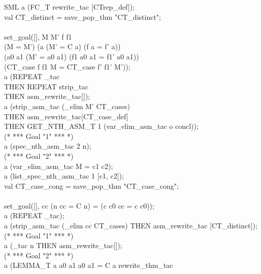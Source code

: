{\begin{GFT}{SML}
\+a (FC\_T rewrite\_tac [CTrep\_def]);\\
\+val CT\_distinct = save\_pop\_thm "CT\_distinct";\\
\+\\
\+set\_goal([], \PrKM{}\MMM{\forall}M M' f f1\MMM{\bullet}\\
\+         (M = M') \MMM{\land} (\MMM{\forall}a\MMM{\bullet} (M' = C a) \MMM{\Rightarrow} (f a = f' a)) \MMM{\land}\\
\+         (\MMM{\forall}a0 a1\MMM{\bullet} (M' = a0  a1) \MMM{\Rightarrow} (f1 a0 a1 = f1' a0 a1)) \MMM{\Rightarrow}\\
\+         (CT\_case f f1 M = CT\_case f' f1' M')\PrKO{});\\
\+a (REPEAT \MMM{\forall}\_tac\\
\+	THEN REPEAT strip\_tac\\
\+	THEN asm\_rewrite\_tac[]);\\
\+a (strip\_asm\_tac (\MMM{\forall}\_elim \PrKM{}M'\PrKO{} CT\_cases)\\
\+	THEN asm\_rewrite\_tac[CT\_case\_def]\\
\+	THEN GET\_NTH\_ASM\_T 1 (var\_elim\_asm\_tac o concl));\\
\+(* *** Goal "1" *** *)\\
\+a (spec\_nth\_asm\_tac 2 \PrKM{}n\PrKO{});\\
\+(* *** Goal "2" *** *)\\
\+a (var\_elim\_asm\_tac \PrKM{}M = c1  c2\PrKO{});\\
\+a (list\_spec\_nth\_asm\_tac 1 [\PrKM{}c1\PrKO{}, \PrKM{}c2\PrKO{}]);\\
\+val CT\_case\_cong = save\_pop\_thm "CT\_case\_cong";\\
\+\\
\+set\_goal([], \PrKM{}\MMM{\forall}cc\MMM{\bullet} \MMM{\lnot} (\MMM{\exists}n\MMM{\bullet} cc = C n) = (\MMM{\exists}c c0\MMM{\bullet} cc = c  c0)\PrKO{});\\
\+a (REPEAT \MMM{\forall}\_tac);\\
\+a (strip\_asm\_tac (\MMM{\forall}\_elim \PrKM{}cc\PrKO{} CT\_cases) THEN asm\_rewrite\_tac [CT\_distinct]);\\
\+(* *** Goal "1" *** *)\\
\+a (\MMM{\exists}\_tac \PrKM{}n\PrKO{} THEN asm\_rewrite\_tac[]);\\
\+(* *** Goal "2" *** *)\\
\+a (LEMMA\_T \PrKM{}\MMM{\forall} a a0 a1\MMM{\bullet} \MMM{\lnot} a0  a1 = C a\PrKO{} rewrite\_thm\_tac\\

\end{GFT}}
